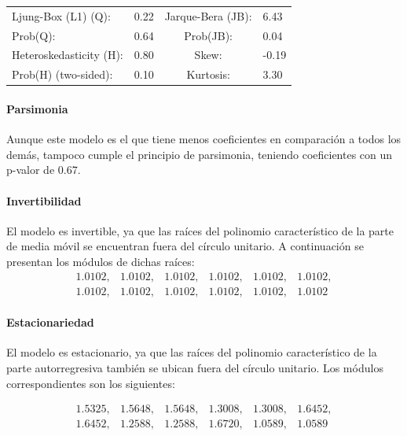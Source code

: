 \documentclass[12pt,letterpaper]{article}   %
\begin{document}
\begin{table}[htbp]
\vspace{0.3cm}

\begin{tabular}{llcl}
\toprule
Ljung-Box (L1) (Q): & 0.22 & Jarque-Bera (JB): & 6.43 \\
Prob(Q): & 0.64 & Prob(JB): & 0.04 \\
Heteroskedasticity (H): & 0.80 & Skew: & -0.19 \\
Prob(H) (two-sided): & 0.10 & Kurtosis: & 3.30 \\
\bottomrule
\end{tabular}

\end{table}


\paragraph{Parsimonia}
Aunque este modelo es el que tiene menos coeficientes en comparación a todos los demás, tampoco cumple el principio de parsimonia, teniendo coeficientes con un p-valor de 0.67. 


\paragraph{Invertibilidad}
El modelo es invertible, ya que las raíces del polinomio característico de la parte de media móvil se encuentran fuera del círculo unitario. A continuación se presentan los módulos de dichas raíces:
\[
\begin{array}{cccccc}
1.0102, & 1.0102, & 1.0102, & 1.0102, & 1.0102, & 1.0102, \\
1.0102, & 1.0102, & 1.0102, & 1.0102, & 1.0102, & 1.0102
\end{array}
\]

\paragraph{Estacionariedad}
El modelo es estacionario, ya que las raíces del polinomio característico de la parte autorregresiva también se ubican fuera del círculo unitario. Los módulos correspondientes son los siguientes:

\[
\begin{array}{cccccc}
1.5325, & 1.5648, & 1.5648, & 1.3008, & 1.3008, & 1.6452, \\
1.6452, & 1.2588, & 1.2588, & 1.6720, & 1.0589, & 1.0589
\end{array}
\]
\end{document}
